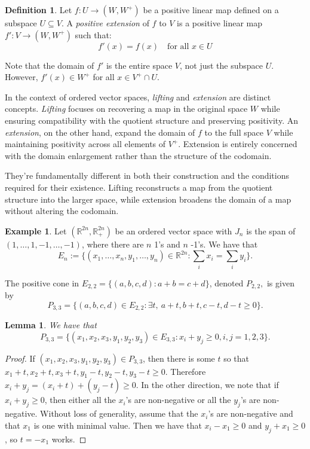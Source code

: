 \documentclass[11pt]{amsart}
\newtheorem{lem}[thm]{Lemma}
\theoremstyle{definition}
\newtheorem{defn}[thm]{Definition}
\newtheorem{example}[thm]{Example}
\def\bb{\mathbb}
\begin{document}
\begin{defn}
    Let $f: U \to (W, W^+)$ be a positive linear map defined on a subspace $U \subseteq V$. A \textit{positive extension} of $f$ to $V$ is a positive linear map $f': V \to (W, W^+)$ such that:
\[
f'(x) = f(x) \quad \text{for all } x \in U
\]
\end{defn}
Note that the domain of $f'$ is the entire space $V$, not just the subspace $U$. However, $f'(x) \in W^+$ for all $x \in V^+ \cap U$.

In the context of ordered vector spaces, \textit{lifting} and \textit{extension} are distinct concepts. \textit{Lifting} focuses on recovering a map in the original space $W$ while ensuring compatibility with the quotient structure and preserving positivity. An \textit{extension}, on the other hand, expand the domain of $f$ to the full space $V$ while maintaining positivity across all elements of $V^+$. Extension is entirely concerned with the domain enlargement rather than the structure of the codomain.

They're fundamentally different in both their construction and the conditions required for their existence. Lifting reconstructs a map from the quotient structure into the larger space, while extension broadens the domain of a map without altering the codomain.

\begin{example} Let \((\bb R^{2n}, \bb R_+^{2n})\) be an ordered vector space with $J_n$ is the span of $(1,\dotsc,1, -1,\dotsc, -1)$, where there are $n$ 1's and $n$ -1's. We have that 
\[
E_n := \{(x_1,\dotsc,x_n,y_1,\dotsc,y_n)\in \bb R^{2n} : \sum_i x_i = \sum_i y_i\}.
\]

The positive cone in $E_{2,2} = \{(a,b,c,d) : a+b = c+d\}$, denoted $P_{2,2},$ is given by 
\[
P_{3,3} = \{(a,b,c,d)\in E_{2,2} : \exists t,\ a+t,b+t,c-t, d-t \geq 0\}.
\]
\end{example}

\begin{lem}\label{lem:p33-alt}
We have that 
    \[P_{3,3} = \{(x_1,x_2,x_3,y_1,y_2,y_3) \in E_{3,3} : x_i + y_j\geq 0, i,j=1,2,3\}.\]
\end{lem}

\begin{proof}
    If $(x_1,x_2,x_3,y_1,y_2,y_3)\in P_{3,3}$, then there is some $t$ so that $x_1+t, x_2+t, x_3+t, y_1-t, y_2-t, y_3-t\geq 0$. Therefore $x_i + y_j = (x_i + t) + (y_j -t)\geq 0$. In the other direction, we note that if $x_i+ y_j\geq 0$, then either all the $x_i$'s are non-negative or all the $y_j$'s are non-negative. Without loss of generality, assume that the $x_i$'s are non-negative and that $x_1$ is one with minimal value. Then we have that $x_i - x_1\geq 0$ and $y_j + x_1\geq 0$, so $t=-x_1$ works. 
\end{proof}
\end{document}
